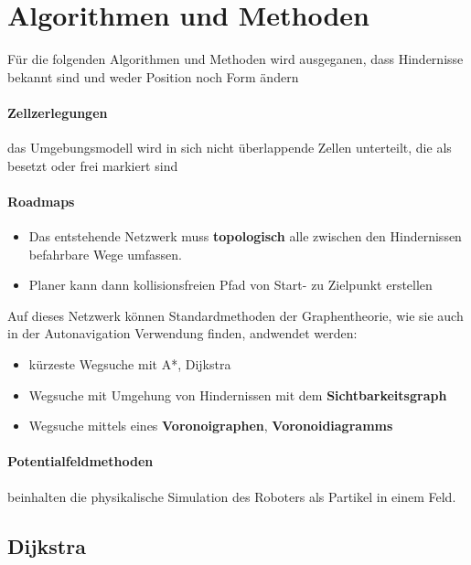 \section{Algorithmen und Methoden}
Für die folgenden Algorithmen und Methoden wird ausgeganen, dass Hindernisse bekannt sind und weder Position noch Form ändern
\paragraph{Zellzerlegungen} das Umgebungsmodell wird in sich nicht überlappende Zellen unterteilt, die als besetzt oder frei markiert sind
\paragraph{Roadmaps}
\begin{itemize}
	\item Das entstehende Netzwerk muss \textbf{topologisch} alle zwischen den Hindernissen befahrbare Wege umfassen.
	\item Planer kann dann kollisionsfreien Pfad von Start- zu Zielpunkt erstellen
\end{itemize}
Auf dieses Netzwerk können Standardmethoden der Graphentheorie, wie sie auch in der Autonavigation Verwendung finden, andwendet werden:
\begin{itemize}
	\item kürzeste Wegsuche mit A*, Dijkstra
	\item Wegsuche mit Umgehung von Hindernissen mit dem \textbf{Sichtbarkeitsgraph}
	\item Wegsuche mittels eines \textbf{Voronoigraphen}, \textbf{Voronoidiagramms}
\end{itemize}
\paragraph{Potentialfeldmethoden} beinhalten die physikalische Simulation des Roboters als Partikel in einem Feld.
\newpage
\subsection{Dijkstra}
